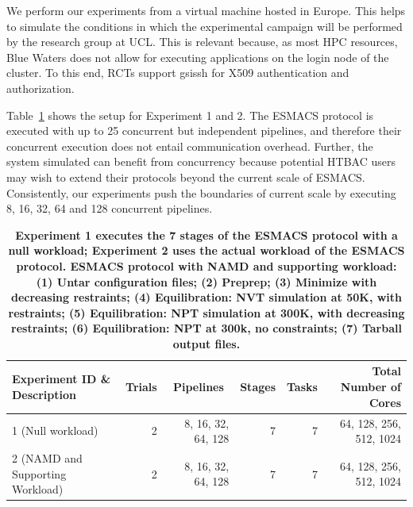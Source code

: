We perform our experiments from a virtual machine hosted in Europe. This
helps to simulate the conditions in which the experimental campaign will be
performed by the research group at UCL\@. This is relevant because, as most
HPC resources, Blue Waters does not allow for executing applications on the
login node of the cluster. To this end, RCTs support \textmd{gsissh} for X509
authentication and authorization.

Table~\ref{tab:exp} shows the setup for Experiment 1 and 2. The
ESMACS protocol is executed with up to 25 concurrent but independent pipelines,
and therefore their concurrent execution does not entail communication
overhead. Further, the system simulated can benefit from concurrency because
potential HTBAC users may wish to extend their protocols beyond the current
scale of ESMACS\@. Consistently, our experiments push the boundaries of
current scale by executing 8, 16, 32, 64 and 128 concurrent pipelines.

\begin{table}[t]
\centering
\caption{\bf Experiment 1 executes the 7 stages of the ESMACS protocol with
a null workload; Experiment 2 uses the actual workload of the ESMACS
protocol. ESMACS protocol with NAMD and supporting workload: (1) Untar
configuration files; (2) Preprep; (3) Minimize with decreasing restraints;
(4) Equilibration: NVT simulation at 50K, with restraints; (5) Equilibration:
NPT simulation at 300K, with decreasing restraints; (6) Equilibration: NPT at
300k, no constraints; (7) Tarball output files.}\label{tab:exp}
\begin{tabular}{lrrrrr}
\hline
\multicolumn{1}{l}{\textbf{Experiment ID \& Description}} & \multicolumn{1}{r}{\textbf{Trials}} & \multicolumn{1}{c}{\textbf{Pipelines}} & \multicolumn{1}{r}{\textbf{Stages}} & \multicolumn{1}{r}{\textbf{Tasks}} & \multicolumn{1}{r}{\textbf{Total Number of Cores}} \\ 
\hline
1 (Null workload)                                           & 2                           & 8, 16, 32, 64, 128             & 7                           & 7                          & 64, 128, 256, 512, 1024                    \\ %
2 (NAMD and Supporting Workload)                                       & 2                           & 8, 16, 32, 64, 128             & 7                           & 7                          & 64, 128, 256, 512, 1024                    \\ \hline
\end{tabular}
\end{table}


